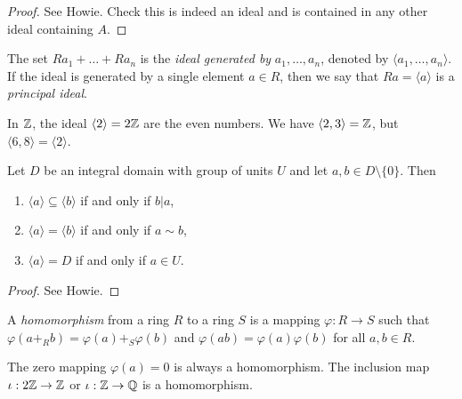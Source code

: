 \begin{proof}
  See Howie. Check this is indeed an ideal
  and is contained in any other ideal containing $A$.
\end{proof}

\begin{definition}
  The set $Ra_1 + \dots + Ra_n$ is the
  \emph{ideal generated by} $a_1, \dots, a_n$,
  denoted by $\langle a_1, \dots, a_n \rangle$.
  If the ideal is generated by a single element
  $a \in R$, then we say that $Ra = \langle a \rangle$
  is a \emph{principal ideal}.
\end{definition}

\begin{example}
  In $\mathbb{Z}$, the ideal $\langle 2 \rangle = 2\mathbb{Z}$ are
  the even numbers. We have
  $\langle 2, 3 \rangle = \mathbb{Z}$, but
  $\langle 6, 8 \rangle = \langle 2 \rangle$.
\end{example}

\begin{theorem}
  Let $D$ be an integral domain with group of units
  $U$ and let $a, b \in D \setminus \{0\}$. Then
  \begin{enumerate}
    \item $\langle a \rangle \subseteq \langle b \rangle$
      if and only if $b | a$,
    \item $\langle a \rangle = \langle b \rangle$
      if and only if $a \sim b$,
    \item $\langle a \rangle = D$ if and only if
      $a \in U$.
  \end{enumerate}
\end{theorem}

\begin{proof}
  See Howie.
\end{proof}

\begin{definition}
  A \emph{homomorphism} from a ring $R$ to a ring $S$
  is a mapping $\varphi : R \to S$ such that
  $\varphi(a +_R b) = \varphi(a) +_S \varphi(b)$ and
  $\varphi(ab) = \varphi(a)\varphi(b)$ for all
  $a, b \in R$.
\end{definition}

\begin{example}
  The zero mapping $\varphi(a) = 0$ is always a
  homomorphism. The inclusion map
  $\iota : 2\mathbb{Z} \to \mathbb{Z}$ or $\iota : \mathbb{Z} \to \mathbb{Q}$ is
  a homomorphism.
\end{example}

